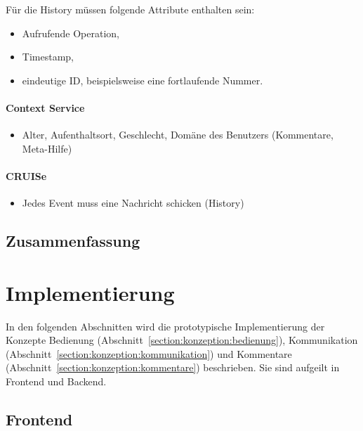 \documentclass[
	headsepline,
	footsepline,
	fontsize=12pt,
	bibliography=totoc
]{scrbook}
\begin{document}
Für die History müssen folgende Attribute enthalten sein:

\begin{itemize}
	\item Aufrufende Operation,
	\item Timestamp,
	\item eindeutige ID, beispielsweise eine fortlaufende Nummer.
\end{itemize}

\subsubsection{Context Service}

\begin{itemize}
	\item Alter, Aufenthaltsort, Geschlecht, Domäne des Benutzers (Kommentare, Meta-Hilfe)
\end{itemize}

\subsubsection{CRUISe}

\begin{itemize}
	\item Jedes Event muss eine Nachricht schicken (History)
\end{itemize}

\section{Zusammenfassung}
\label{section:konzeption:zusammenfassung}

\chapter{Implementierung}
\label{chapter:implementierung}

In den folgenden Abschnitten wird die prototypische Implementierung der Konzepte Bedienung (Abschnitt~\ref{section:konzeption:bedienung}), Kommunikation (Abschnitt~\ref{section:konzeption:kommunikation}) und Kommentare (Abschnitt~\ref{section:konzeption:kommentare}) beschrieben. Sie sind aufgeilt in Frontend und Backend.

\section{Frontend}
\label{section:implementierung:frontend}
\end{document}
